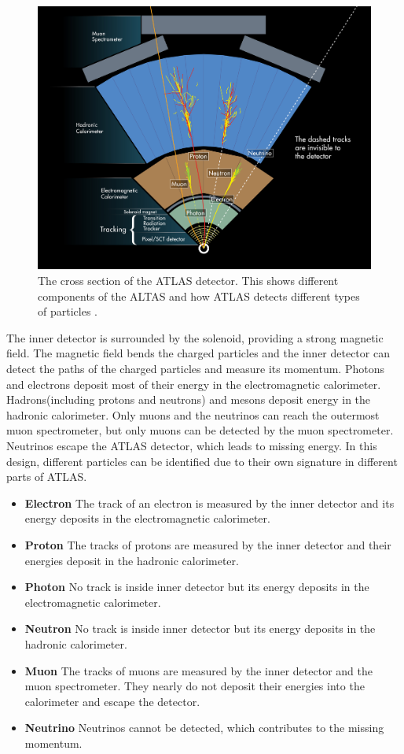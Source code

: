 \begin{figure}
\centering
\includegraphics[width=\textwidth]{data/photo/detector/ATLAS_particles.jpg}
\caption{The cross section of the ATLAS detector. This shows different components of the ALTAS and how ATLAS detects different types of particles \cite{ATLAS_particles}.}
\label{fig:ATLAS_particles}
\end{figure}
The inner detector is surrounded by the solenoid, providing a strong magnetic field.
The magnetic field bends the charged particles and the inner detector can detect the paths of the charged particles and measure its momentum.
Photons and electrons deposit most of their energy in the electromagnetic calorimeter.
Hadrons(including protons and neutrons) and mesons deposit energy in the hadronic calorimeter.
Only muons and the neutrinos can reach the outermost muon spectrometer, but only muons can be detected by the muon spectrometer.
Neutrinos escape the ATLAS detector, which leads to missing energy.
In this design, different particles can be identified due to their own signature in different parts of ATLAS.

\begin{itemize}
\item \textbf{Electron} The track of an electron is measured by the inner detector and its energy deposits in the electromagnetic calorimeter.
\item \textbf{Proton} The tracks of protons are measured by the inner detector and their energies deposit in the hadronic calorimeter.
\item \textbf{Photon} No track is inside inner detector but its energy deposits in the electromagnetic calorimeter.
\item \textbf{Neutron} No track is inside inner detector but its energy deposits in the hadronic calorimeter.
\item \textbf{Muon} The tracks of muons are measured by the inner detector and the muon spectrometer. They nearly do not deposit their energies into the calorimeter and escape the detector.
\item \textbf{Neutrino} Neutrinos cannot be detected, which contributes to the missing momentum.
\end{itemize}

